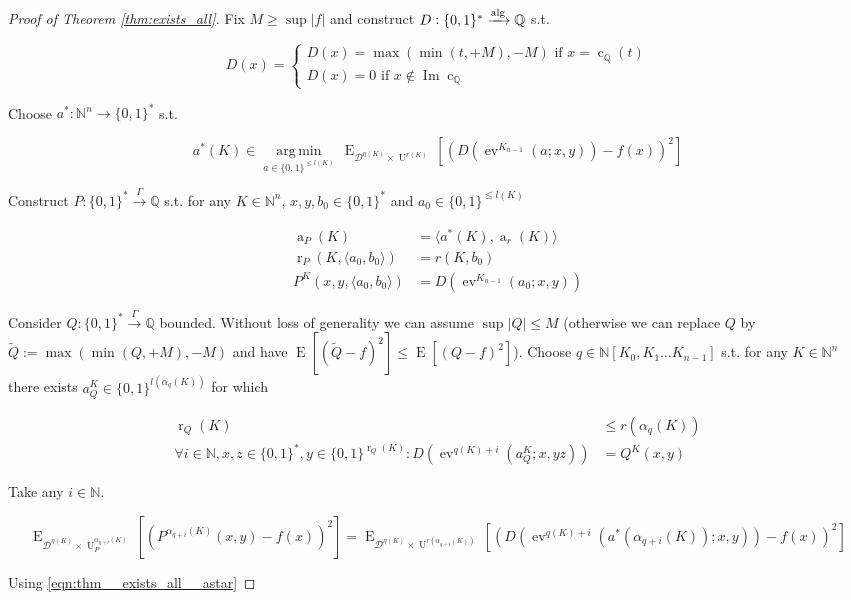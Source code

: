 \documentclass[11pt]{article}
\numberwithin{equation}{section}
\theoremstyle{definition}
\theoremstyle{plain}
\newcommand{\Bool}{\{0,1\}}
\newcommand{\Words}{{\Bool^*}}
\DeclareMathOperator{\Img}{Im}
\DeclareMathOperator{\E}{E}
\DeclareMathOperator{\Ev}{ev}
\DeclareMathOperator{\R}{r}
\DeclareMathOperator{\A}{a}
\DeclareMathOperator{\Un}{U}
\DeclareMathOperator{\En}{c}
\newcommand{\Argmin}[1]{\underset{#1}{\operatorname{arg\,min}}\,}
\newcommand{\Nats}{\mathbb{N}}
\newcommand{\Rats}{\mathbb{Q}}
\newcommand{\NatPoly}{\Nats[K_0, K_1 \ldots K_{n-1}]}
\newcommand{\Abs}[1]{\lvert #1 \rvert}
\newcommand{\Chev}[1]{\langle #1 \rangle}
\newcommand{\Dist}{\mathcal{D}}
\newcommand{\BoolR}[1]{\Bool^{\R_{#1}(K)}}
\newcommand{\Alg}{\xrightarrow{\textnormal{alg}}}
\newcommand{\Scheme}{\xrightarrow{\Gamma}}
\begin{document}
\begin{proof}[Proof of Theorem \ref{thm:exists_all}]

Fix $M \geq \sup \Abs{f}$ and construct ${D: \Words \Alg \Rats}$ s.t.

\[D(x)=\begin{cases}D(x)=\max(\min(t,+M),-M) \text{ if ${x = \En_\Rats(t)}$}\\D(x)=0 \text{ if } x \not\in \Img \En_\Rats\end{cases}\]

Choose ${a^*: \Nats^n \rightarrow \Words}$ s.t.

\begin{equation}
\label{eqn:thm__exists_all__astar}
a^*(K) \in \Argmin{a \in \Bool^{\leq l(K)}} \E_{\Dist^{\eta(K)} \times \Un^{r(K)}}[(D(\Ev^{K_{n-1}}(a;x,y))-f(x))^2]
\end{equation} 

Construct ${P: \Words \Scheme \Rats}$ s.t. for any ${K \in \Nats^n}$, ${x,y,b_0 \in \Words}$ and ${a_0 \in \Bool^{\leq l(K)}}$

\begin{align}
\A_P(K) &= \Chev{a^*(K),\A_r(K)}\\
\R_P(K,\Chev{a_0,b_0}) &= r(K,b_0) \\
P^K(x,y,\Chev{a_0,b_0}) &= D(\Ev^{K_{n-1}}(a_0;x,y))
\end{align}

Consider ${Q: \Words \Scheme \Rats}$ bounded. Without loss of generality we can assume $\sup \Abs{Q} \leq M$ (otherwise we can replace ${Q}$ by ${\tilde{Q}:=\max(\min(Q,+M),-M)}$ and have ${\E[(\tilde{Q}-f)^2]\leq\E[(Q-f)^2]}$). Choose ${q \in \NatPoly}$ s.t. for any ${K \in \Nats^n}$ there exists ${a_Q^K \in \Bool^{l(\alpha_q(K))}}$ for which

\begin{align}
\label{eqn:thm__exists_all__q_rnd}\R_Q(K) &\leq r(\alpha_q(K)) \\
\label{eqn:thm__exists_all__q_adv}\forall i \in \Nats, x,z \in \Words, y \in \BoolR{Q}: D(\Ev^{q(K)+i}(a_Q^K;x,yz))&=Q^K(x,y)
\end{align}

Take any ${i \in \Nats}$.

\[\E_{ \Dist^{\eta(K)} \times \Un_P^{\alpha_{q+i}(K)}}[(P^{\alpha_{q+i}(K)}(x,y)-f(x))^2]=\E_{ \Dist^{\eta(K)} \times \Un^{r(\alpha_{q+i}(K))}}[(D(\Ev^{q(K)+i}(a^*(\alpha_{q+i}(K));x,y))-f(x))^2]\]

Using \ref{eqn:thm__exists_all__astar}


\end{proof}
\end{document}
